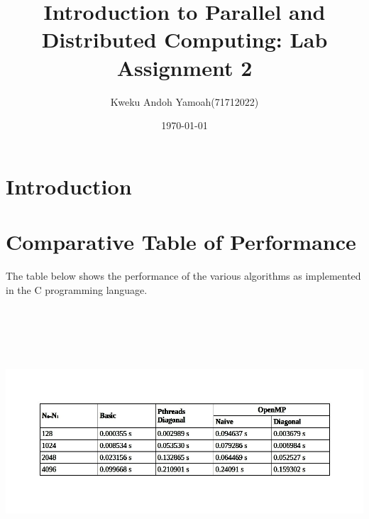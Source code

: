 \documentclass[12pt, a4paper, fleqn, titlepage]{article}
\title{Introduction to Parallel and Distributed Computing: Lab Assignment 2}
\author{Kweku Andoh Yamoah(71712022)}
\date{\today}
\begin{document}
\maketitle
\justify

\section{Introduction}
\section{Comparative Table of  Performance}
    The table below shows the performance of the various algorithms as implemented in the C programming language.
    \begin{flushleft}
        \includegraphics[width= 18cm,height = 10cm, keepaspectratio,scale=0.5]{performance-table}
    \end{flushleft}
        
\end{document}
